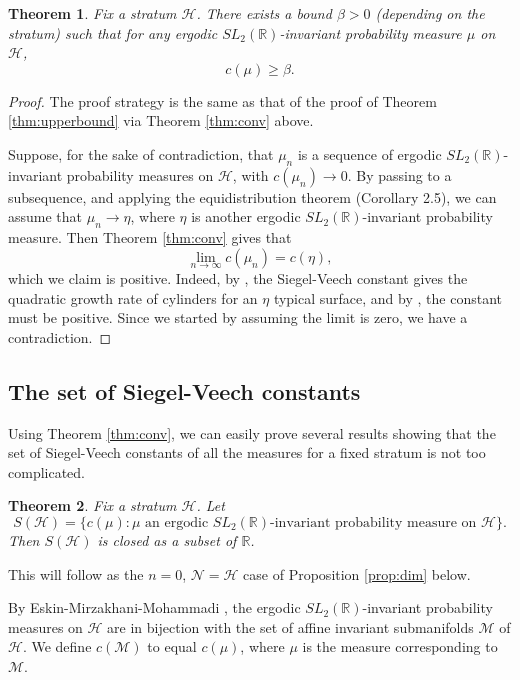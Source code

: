 \documentclass{article}
\newtheorem{thm}{Theorem}[section]
\theoremstyle{definition}
\begin{document}
\begin{thm} \label{thm:lowerbound}
  Fix a stratum $\mathcal{H}$.  There exists a bound $\beta>0$ (depending on the stratum) such that for any ergodic $SL_2(\mathbb{R})$-invariant probability measure $\mu$ on $\mathcal{H}$,
$$c(\mu) \ge \beta.$$
\end{thm}

\begin{proof} 
  The proof strategy is the same as that of the proof of Theorem \ref{thm:upperbound} via Theorem \ref{thm:conv} above.   

Suppose, for the sake of contradiction, that $\mu_n$ is a sequence of ergodic $SL_2(\mathbb{R})$-invariant probability measures on $\mathcal{H}$, with $c(\mu_n) \to 0$.  By passing to a subsequence, and applying the equidistribution theorem \cite{emm2015} (Corollary 2.5), we can assume that $\mu_n \to \eta$, where $\eta$ is another ergodic $SL_2(\mathbb{R})$-invariant probability measure.  Then Theorem \ref{thm:conv} gives that 
$$\lim_{n\to\infty} c(\mu_n) = c(\eta),$$
which we claim is positive.  Indeed, by \cite{em2001}, the Siegel-Veech constant gives the quadratic growth rate of cylinders for an $\eta$ typical surface, and by \cite{masur1988}, the constant must be positive.   
Since we started by assuming the limit is zero, we have a contradiction.    
\end{proof}

\subsection{The set of Siegel-Veech constants}

Using Theorem \ref{thm:conv}, we can easily prove several results showing that the set of Siegel-Veech constants of all the measures for a fixed stratum is not too complicated.  
\begin{thm}
  Fix a stratum $\mathcal{H}$.  Let 
$$S(\mathcal{H}) = \{ c(\mu) : \mu \text{ an ergodic } SL_2(\mathbb{R}) \text{-invariant probability measure on } \mathcal{H}\}.$$
Then $S(\mathcal{H})$ is closed as a subset of $\mathbb{R}$.    
\end{thm}

This will follow as the $n=0$, $\mathcal{N}=\mathcal{H}$ case of Proposition \ref{prop:dim} below.    

By Eskin-Mirzakhani-Mohammadi \cite{emm2015}, the ergodic $SL_2(\mathbb{R})$-invariant probability measures on $\mathcal{H}$ are in bijection with the set of affine invariant submanifolds $\mathcal{M}$ of $\mathcal{H}$. We define $c(\mathcal{M})$ to equal $c(\mu)$, where $\mu$ is the measure corresponding to $\mathcal{M}$.  
\end{document}
